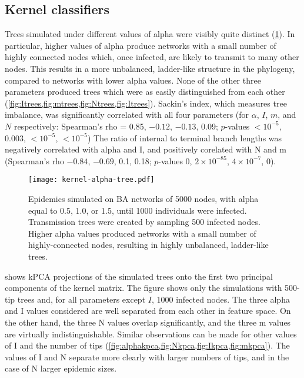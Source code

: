 

\subsection{Kernel classifiers}



Trees simulated under different values of \gls{alpha} were visibly quite
distinct (\cref{fig:alphatrees}). In particular, higher values of \gls{alpha}
produce networks with a small number of highly connected nodes which, once
infected, are likely to transmit to many other nodes. This results in a more
unbalanced, ladder-like structure in the phylogeny, compared to networks with
lower \gls{alpha} values. None of the other three parameters produced trees
which were as easily distinguished from each other
(\cref{fig:Itrees,fig:mtrees,fig:Ntrees,fig:Itrees}).
Sackin's index, which measures tree imbalance, was significantly correlated with
all four parameters
    (for $\alpha$, $I$, $m$, and $N$ respectively: Spearman's rho =
     0.85,
     \ensuremath{-0.12},
     \ensuremath{-0.13},
     0.09;
     $p$-values
     $<10^{-5}$,
     $0.003$,
     $<10^{-5}$,
     $<10^{-5}$)
The ratio of internal to terminal branch lengths was negatively correlated with
\gls{alpha} and \gls{I}, and positively corelated with \gls{N} and \gls{m}
  (Spearman's rho
    \ensuremath{-0.84},
    \ensuremath{-0.69},
    0.1,
    0.18;
  $p$-values
    $0$,
    $2\!\times\!10^{-85}$,
    $4\!\times\!10^{-7}$,
    $0$).

\begin{figure}[ht]
  \centering
  \texttt{[image: kernel-alpha-tree.pdf]}
  \caption[Visibly distinctive trees simulated under three values of \gls{alpha}]{
    Epidemics simulated on \gls{BA} networks of 5000 nodes, with \gls{alpha}
    equal to 0.5, 1.0, or 1.5, until 1000 individuals were infected.
    Transmission trees were created by sampling 500 infected nodes. Higher
    \gls{alpha} values produced networks with a small number of
    highly-connected nodes, resulting in highly unbalanced, ladder-like trees.
  }
  \label{fig:alphatrees}
\end{figure}

 shows \gls{kPCA} projections of the simulated trees onto the
first two principal components of the kernel matrix. The figure shows only the
simulations with 500-tip trees and, for all parameters except $I$, 1000
infected nodes. The three \gls{alpha} and \gls{I} values considered are well
separated from each other in feature space. On the other hand, the three
\gls{N} values overlap significantly, and the three \gls{m} values are
virtually indistinguishable. Similar observations can be made for other values
of \gls{I} and the number of tips
(\cref{fig:alphakpca,fig:Nkpca,fig:Ikpca,fig:mkpca}). The values of \gls{I} and
\gls{N} separate more clearly with larger numbers of tips, and in the case of
\gls{N} larger epidemic sizes.

